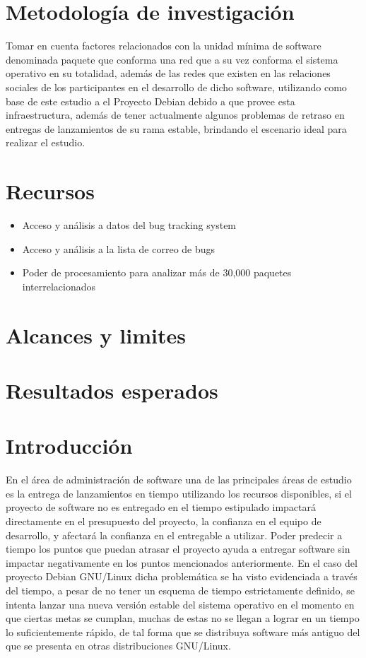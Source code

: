 \documentclass[12pt]{report}
\begin{document}
\chapter*{Metodología de investigación} %
Tomar en  cuenta  factores  relacionados con  la  unidad  mínima  de
software denominada paquete que conforma una red que a su vez conforma
el sistema operativo en su totalidad,  además de las redes que existen
en las  relaciones sociales de  los participantes en el  desarrollo de
dicho software,  utilizando como  base de este  estudio a  el Proyecto
Debian  debido a  que  provee esta  infraestructura,  además de  tener
actualmente algunos  problemas de retraso en  entregas de lanzamientos
de  su rama  estable, brindando  el escenario  ideal para  realizar el
estudio.

\chapter*{Recursos}
\begin{itemize}
\item Acceso y análisis a datos del bug tracking system
\item Acceso y análisis a la lista de correo de bugs
\item Poder de  procesamiento para  analizar más  de 30,000  paquetes
  interrelacionados
\end{itemize}


\chapter*{Alcances y limites}

\chapter*{Resultados esperados}


\chapter*{Introducción}
En el área de administración de  software una de las principales áreas
de  estudio es  la entrega  de lanzamientos  en tiempo  utilizando los
recursos disponibles, si el proyecto de software no es entregado en el
tiempo  estipulado  impactará  directamente   en  el  presupuesto  del
proyecto,  la confianza  en el  equipo  de desarrollo,  y afectará  la
confianza en  el entregable  a utilizar. Poder  predecir a  tiempo los
puntos que  puedan atrasar el  proyecto ayuda a entregar  software sin
impactar negativamente en los puntos mencionados anteriormente.  En el
caso  del proyecto  Debian GNU/Linux  dicha problemática  se ha  visto
evidenciada a  través del tiempo,  a pesar de  no tener un  esquema de
tiempo  estrictamente definido,  se intenta  lanzar una  nueva versión
estable del  sistema operativo en el  momento en que ciertas  metas se
cumplan,  muchas de  estas  no se  llegan  a lograr  en  un tiempo  lo
suficientemente rápido,  de tal forma  que se distribuya  software más
antiguo del que se presenta en otras distribuciones GNU/Linux.
\end{document}
